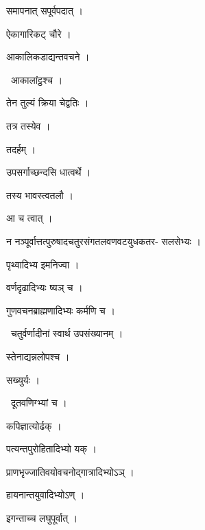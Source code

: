 \documentclass[10pt, openany, oneside]{book}
\begin{document}
\noindent समापनात् सपूर्वपदात् ।

\noindent ऐकागारिकट् चौरे ।

\noindent आकालिकडाद्यन्तवचने ।

\par\noindent\hspace{1.5em}{\vps वा॰}~{\qt आकालांट्ठश्च ।}

\noindent तेन तुल्यं क्रिया चेद्वतिः ।

\noindent तत्र तस्येव ।

\noindent तदर्हम् ।

\noindent उपसर्गाच्छन्दसि धात्वर्थे ।

\noindent तस्य भावस्त्वतलौ ।

\noindent आ च त्वात् ।

\noindent न नञ्पूर्वात्तत्पुरुषादचतुरसंगतलवणवटयुधकतर- सलसेभ्यः ।

\noindent पृथ्वादिभ्य इमनिज्वा ।

\noindent वर्णदृढादिभ्यः ष्यञ् च ।

\noindent गुणवचनब्राह्मणादिभ्यः कर्मणि च ।

\par\noindent\hspace{1.5em}{\vps वा॰}~{\qt चतुर्वर्णादीनां स्वार्थ उपसंख्यानम् ।}

\noindent स्तेनाद्यन्नलोपश्च ।

\noindent सख्युर्यः ।

\par\noindent\hspace{1.5em}{\vps वा॰}~{\qt दूतवणिग्भ्यां च ।}

\noindent कपिज्ञात्योर्ढक् ।

\noindent पत्यन्तपुरोहितादिभ्यो यक् ।

\noindent प्राणभृज्जातिवयोवचनोद्गात्रादिभ्योऽञ् ।

\noindent हायनान्तयुवादिभ्योऽण् ।

\noindent इगन्ताच्च लघुपूर्वात् ।
\end{document}
